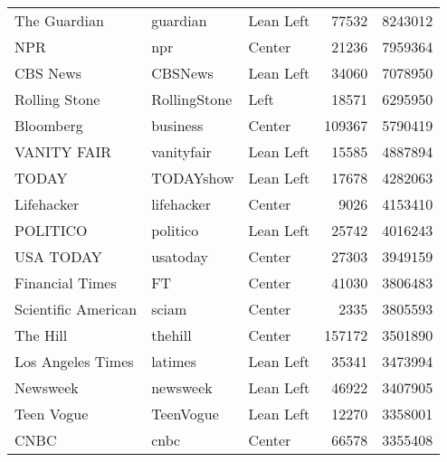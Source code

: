 \begin{tabular}{lllrr}
                             The Guardian &         guardian &     Lean Left &             77532 &    8243012 \\
                                      NPR &              npr &        Center &             21236 &    7959364 \\
                                 CBS News &          CBSNews &     Lean Left &             34060 &    7078950 \\
                            Rolling Stone &     RollingStone &          Left &             18571 &    6295950 \\
                                Bloomberg &         business &        Center &            109367 &    5790419 \\
                              VANITY FAIR &       vanityfair &     Lean Left &             15585 &    4887894 \\
                                    TODAY &        TODAYshow &     Lean Left &             17678 &    4282063 \\
                               Lifehacker &       lifehacker &        Center &              9026 &    4153410 \\
                                 POLITICO &         politico &     Lean Left &             25742 &    4016243 \\
                                USA TODAY &         usatoday &        Center &             27303 &    3949159 \\
                          Financial Times &               FT &        Center &             41030 &    3806483 \\
                      Scientific American &            sciam &        Center &              2335 &    3805593 \\
                                 The Hill &          thehill &        Center &            157172 &    3501890 \\
                        Los Angeles Times &          latimes &     Lean Left &             35341 &    3473994 \\
                                 Newsweek &         newsweek &     Lean Left &             46922 &    3407905 \\
                               Teen Vogue &        TeenVogue &     Lean Left &             12270 &    3358001 \\
                                     CNBC &             cnbc &        Center &             66578 &    3355408 \\

\end{tabular}
